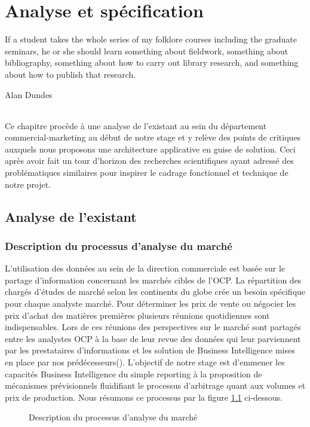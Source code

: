 \chapter{Analyse et spécification}
\epigraph{If a student takes the whole series of my folklore courses including the graduate seminars, he or she should learn something about fieldwork, something about bibliography, something about how to carry out library research, and something about how to publish that research.}{Alan Dundes}
\subparagraph{}
Ce chapitre procède à une analyse de l'existant au sein du département commercial-marketing au début de notre stage et y relève des points de critiques auxquels nous proposons une architecture applicative en guise de solution. Ceci après avoir fait un tour d'horizon des recherches scientifiques ayant adressé des problématiques similaires pour inspirer le cadrage fonctionnel et technique de notre projet.
\cleardoublepage

\section{Analyse de l’existant}
\subsection{Description du processus d'analyse du marché}
L’utilisation des données au sein de la direction commerciale est basée sur le partage
d’information concernant les marchés cibles de l’OCP. La répartition des chargés d'études de
marché selon les continents du globe crée un besoin spécifique pour chaque analyste marché.
Pour déterminer les prix de vente ou négocier les prix d’achat des matières premières plusieurs
réunions quotidiennes sont indispensables. Lors de ces réunions des perspectives sur le marché sont partagés entre les analystes OCP à la base de leur revue des données qui leur parviennent par les prestataires d'informations et les solution de Business Intelligence mises en place par nos prédécesseurs(\cite{NACER,CHEMLAL}). L'objectif de notre stage est d'emmener les capacités Business Intelligence du simple reporting à la proposition de mécanismes prévisionnels fluidifiant le processus d'arbitrage quant aux volumes et prix de production. Nous résumons ce processus par la figure \ref{fig:exista} ci-dessous.
			\begin{figure}[H]
					\centering
				\caption{Description du processus d'analyse du marché}
				\label{fig:exista}
			\end{figure}
